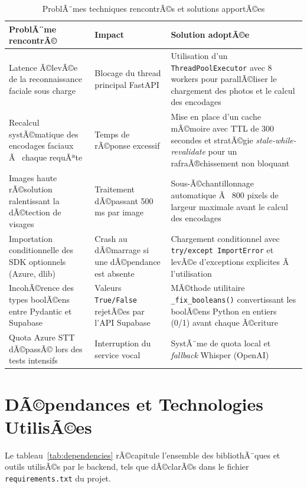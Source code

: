 \begin{table}[H]
\centering
\caption{ProblÃ¨mes techniques rencontrÃ©s et solutions apportÃ©es}
\label{tab:problemes}
\renewcommand{\arraystretch}{1.4}
\begin{tabularx}{\textwidth}{|p{3.8cm}|p{3.2cm}|X|}
\hline
\textbf{ProblÃ¨me rencontrÃ©} & \textbf{Impact} & \textbf{Solution adoptÃ©e} \\
\hline
Latence Ã©levÃ©e de la reconnaissance faciale sous charge
  & Blocage du thread principal FastAPI
  & Utilisation d'un \texttt{ThreadPoolExecutor} avec 8 workers
    pour parallÃ©liser le chargement des photos et le calcul des
    encodages \\
\hline
Recalcul systÃ©matique des encodages faciaux Ã  chaque requÃªte
  & Temps de rÃ©ponse excessif
  & Mise en place d'un cache mÃ©moire avec TTL de 300 secondes et
    stratÃ©gie \textit{stale-while-revalidate} pour un
    rafraÃ®chissement non bloquant \\
\hline
Images haute rÃ©solution ralentissant la dÃ©tection de visages
  & Traitement dÃ©passant 500\,ms par image
  & Sous-Ã©chantillonnage automatique Ã  800 pixels de largeur
    maximale avant le calcul des encodages \\
\hline
Importation conditionnelle des SDK optionnels (Azure, dlib)
  & Crash au dÃ©marrage si une dÃ©pendance est absente
  & Chargement conditionnel avec \texttt{try/except ImportError}
    et levÃ©e d'exceptions explicites Ã  l'utilisation \\
\hline
IncohÃ©rence des types boolÃ©ens entre Pydantic et Supabase
  & Valeurs \texttt{True/False} rejetÃ©es par l'API Supabase
  & MÃ©thode utilitaire \texttt{\_fix\_booleans()} convertissant
    les boolÃ©ens Python en entiers (0/1) avant chaque Ã©criture \\
\hline
Quota Azure STT dÃ©passÃ© lors des tests intensifs
  & Interruption du service vocal
  & SystÃ¨me de quota local et \textit{fallback} Whisper (OpenAI) \\
\hline
\end{tabularx}
\end{table}

\section{DÃ©pendances et Technologies UtilisÃ©es}

Le tableau~\ref{tab:dependencies} rÃ©capitule l'ensemble des
bibliothÃ¨ques et outils utilisÃ©s par le backend, tels que
dÃ©clarÃ©s dans le fichier \texttt{requirements.txt} du projet.

